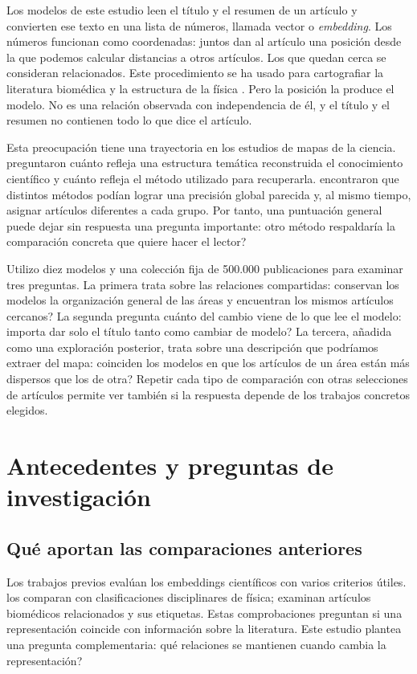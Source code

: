 \documentclass[12pt]{article}
\begin{document}
Los modelos de este estudio leen el título y el resumen de un artículo y convierten ese texto en una lista de números, llamada vector o \emph{embedding}. Los números funcionan como coordenadas: juntos dan al artículo una posición desde la que podemos calcular distancias a otros artículos. Los que quedan cerca se consideran relacionados. Este procedimiento se ha usado para cartografiar la literatura biomédica y la estructura de la física \citep{refbe130e2973,refc0e2cc29e0}. Pero la posición la produce el modelo. No es una relación observada con independencia de él, y el título y el resumen no contienen todo lo que dice el artículo.

Esta preocupación tiene una trayectoria en los estudios de mapas de la ciencia. \citet{refa0d2d707e6} preguntaron cuánto refleja una estructura temática reconstruida el conocimiento científico y cuánto refleja el método utilizado para recuperarla. \citet{ref6a2f5912bc} encontraron que distintos métodos podían lograr una precisión global parecida y, al mismo tiempo, asignar artículos diferentes a cada grupo. Por tanto, una puntuación general puede dejar sin respuesta una pregunta importante: \textquestiondown{}otro método respaldaría la comparación concreta que quiere hacer el lector?

Utilizo diez modelos y una colección fija de 500.000 publicaciones para examinar tres preguntas. La primera trata sobre las relaciones compartidas: \textquestiondown{}conservan los modelos la organización general de las áreas y encuentran los mismos artículos cercanos? La segunda pregunta cuánto del cambio viene de lo que lee el modelo: \textquestiondown{}importa dar solo el título tanto como cambiar de modelo? La tercera, añadida como una exploración posterior, trata sobre una descripción que podríamos extraer del mapa: \textquestiondown{}coinciden los modelos en que los artículos de un área están más dispersos que los de otra? Repetir cada tipo de comparación con otras selecciones de artículos permite ver también si la respuesta depende de los trabajos concretos elegidos.

\section{Antecedentes y preguntas de investigación}
\subsection{Qué aportan las comparaciones anteriores}
Los trabajos previos evalúan los embeddings científicos con varios criterios útiles. \citet{refc0e2cc29e0} los comparan con clasificaciones disciplinares de física; \citet{refbe130e2973} examinan artículos biomédicos relacionados y sus etiquetas. Estas comprobaciones preguntan si una representación coincide con información sobre la literatura. Este estudio plantea una pregunta complementaria: \textquestiondown{}qué relaciones se mantienen cuando cambia la representación?
\end{document}
